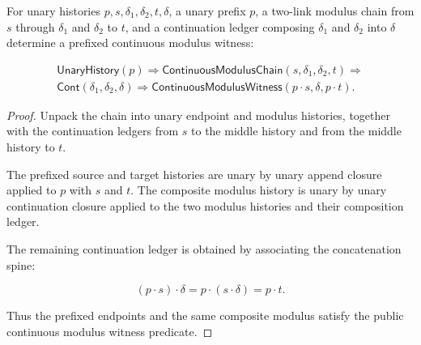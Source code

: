 \begin{theorem}
\label{thm:continuous-modulus-prefixed-composite-closed}
For unary histories $p,s,\delta_1,\delta_2,t,\delta$, a unary prefix $p$, a
two-link modulus chain from $s$ through $\delta_1$ and $\delta_2$ to $t$, and a
continuation ledger composing $\delta_1$ and $\delta_2$ into $\delta$ determine
a prefixed continuous modulus witness:

$$
\begin{array}{l}
\mathsf{UnaryHistory}(p)
\Longrightarrow
\mathsf{ContinuousModulusChain}(s,\delta_1,\delta_2,t)
\Longrightarrow
\\
\mathsf{Cont}(\delta_1,\delta_2,\delta)
\Longrightarrow
\mathsf{ContinuousModulusWitness}(p\cdot s,\delta,p\cdot t).
\end{array}
$$

\end{theorem}
\begin{proof}
Unpack the chain into unary endpoint and modulus histories, together with the
continuation ledgers from $s$ to the middle history and from the middle history
to $t$.

The prefixed source and target histories are unary by unary append closure
applied to $p$ with $s$ and $t$. The composite modulus history is unary by unary
continuation closure applied to the two modulus histories and their composition
ledger.

The remaining continuation ledger is obtained by associating the concatenation
spine:

$$
(p\cdot s)\cdot\delta
=
p\cdot(s\cdot\delta)
=
p\cdot t.
$$

Thus the prefixed endpoints and the same composite modulus satisfy the public
continuous modulus witness predicate.
\end{proof}

